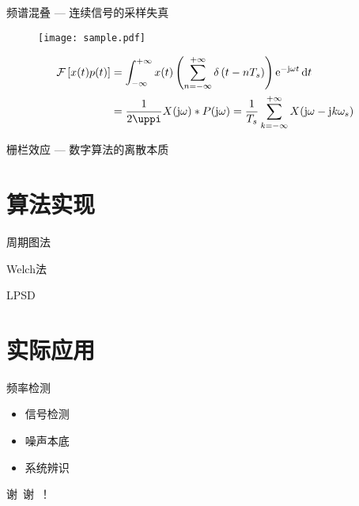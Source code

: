 \documentclass{beamer}
\begin{document}
\begin{frame}{频谱混叠 --- 连续信号的采样失真}
    \begin{figure}
        \centering
        \texttt{[image: sample.pdf]}
    \end{figure}
    \begin{align*}
        \mathcal{F}\left[x(t)p(t)\right] &= \int_{-\infty}^{+\infty} x(t) \left(\sum_{n=-\infty}^{+\infty} \delta \left(t-nT_s\right)\right) \e{-\j\omega t} \dif t \\
        &= \frac{1}{2\uppi} X(\j\omega) \ast P(\j\omega)
        = \frac{1}{T_s} \sum_{k=-\infty}^{+\infty} X(\j\omega - \j k \omega_s)
    \end{align*}
\end{frame}


\begin{frame}{栅栏效应 --- 数字算法的离散本质}
    
\end{frame}


\section{算法实现}
\begin{frame}{周期图法}
    
\end{frame}

\begin{frame}{Welch法}
    
\end{frame}

\begin{frame}{LPSD}
    
\end{frame}



\section{实际应用}
\begin{frame}{频率检测}
    \begin{itemize}
        \item 信号检测
        \item 噪声本底
        \item 系统辨识
    \end{itemize}
\end{frame}



\begin{frame}[standout]
     谢\ 谢\ ！
\end{frame}
\end{document}
